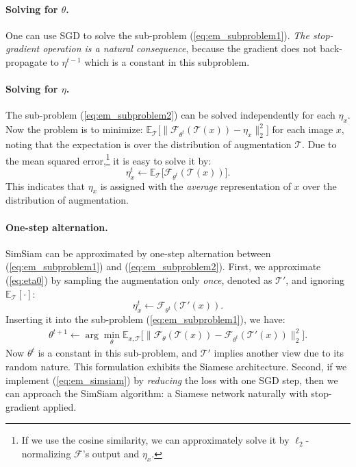 \documentclass[final]{cvpr}
\begin{document}
\paragraph{Solving for $\theta$.} One can use SGD to solve the sub-problem (\ref{eq:em_subproblem1}).
\emph{The stop-gradient operation is a natural consequence}, because the gradient does not back-propagate to $\eta^{t-1}$ which is a constant in this subproblem.

\paragraph{Solving for $\eta$.} The sub-problem (\ref{eq:em_subproblem2}) can be solved independently for each $\eta_x$. Now the problem is to minimize:
$
\mathbb{E}_{\mathcal{T}}
\Big[
	\|
	\mathcal{F}_{\theta^t}(\mathcal{T}(x)) - \eta_{x} 
	\|^2_2
\Big]
$
for each image $x$, noting that the expectation is over the distribution of augmentation $\mathcal{T}$.
Due to the mean squared error,\footnote{If we use the cosine similarity, we can approximately 
solve it by $\ell_2$-normalizing $\mathcal{F}$'s output and $\eta_x$.} it is easy to solve it by:
\begin{equation}
\eta^t_x \leftarrow
\mathbb{E}_{\mathcal{T}}
\Big[
	\mathcal{F}_{\theta^t}(\mathcal{T}(x))
\Big].
\label{eq:eta0}
\end{equation}
This indicates that $\eta_x$ is assigned with the \emph{average} representation of $x$ over the distribution of augmentation.

\paragraph{One-step alternation.} SimSiam can be approximated by one-step alternation between (\ref{eq:em_subproblem1}) and (\ref{eq:em_subproblem2}).
First, we approximate (\ref{eq:eta0}) by 
sampling the augmentation only \emph{once}, denoted as $\mathcal{T}'$, and ignoring $\mathbb{E}_{\mathcal{T}}[\cdot]$:
\begin{equation}
\eta^{t}_x \leftarrow
	\mathcal{F}_{\theta^t}(\mathcal{T'}(x)).
\label{eq:eta}
\end{equation}
Inserting it into the sub-problem (\ref{eq:em_subproblem1}), we have:
\begin{gather}
\theta^{t+1} \leftarrow \arg\min_{\theta}
\mathbb{E}_{x, \mathcal{T}}
\Big[
	\big\|
	\mathcal{F}_\theta(\mathcal{T}(x)) - \mathcal{F}_{\theta^{t}}(\mathcal{T'}(x))
	\big\|_2^2
\Big].
\label{eq:em_simsiam}
\end{gather}
Now $\theta^{t}$ is a constant in this sub-problem, and $\mathcal{T'}$ implies another view due to its random nature. This formulation exhibits the Siamese architecture. 
Second, if we implement (\ref{eq:em_simsiam}) by \emph{reducing} the loss with one SGD step, then we can approach the SimSiam algorithm: a Siamese network naturally with stop-gradient applied.
\end{document}
